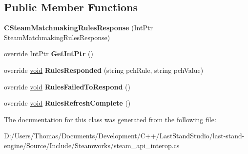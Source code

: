 \subsection*{Public Member Functions}
\begin{DoxyCompactItemize}
\item 
\hypertarget{classValve_1_1Steamworks_1_1CSteamMatchmakingRulesResponse_ad5876b16e99e501e32f796babdb3693d}{}{\bfseries C\+Steam\+Matchmaking\+Rules\+Response} (Int\+Ptr Steam\+Matchmaking\+Rules\+Response)\label{classValve_1_1Steamworks_1_1CSteamMatchmakingRulesResponse_ad5876b16e99e501e32f796babdb3693d}

\item 
\hypertarget{classValve_1_1Steamworks_1_1CSteamMatchmakingRulesResponse_a84d95ba9cbd3a9f2ecad35c6f7577706}{}override Int\+Ptr {\bfseries Get\+Int\+Ptr} ()\label{classValve_1_1Steamworks_1_1CSteamMatchmakingRulesResponse_a84d95ba9cbd3a9f2ecad35c6f7577706}

\item 
\hypertarget{classValve_1_1Steamworks_1_1CSteamMatchmakingRulesResponse_a806baba8409d76e4c45d60acf83f9e78}{}override \hyperlink{SDL__audio_8h_a52835ae37c4bb905b903cbaf5d04b05f}{void} {\bfseries Rules\+Responded} (string pch\+Rule, string pch\+Value)\label{classValve_1_1Steamworks_1_1CSteamMatchmakingRulesResponse_a806baba8409d76e4c45d60acf83f9e78}

\item 
\hypertarget{classValve_1_1Steamworks_1_1CSteamMatchmakingRulesResponse_a0e0e4599c2a1769b048b6ee9a3ee9182}{}override \hyperlink{SDL__audio_8h_a52835ae37c4bb905b903cbaf5d04b05f}{void} {\bfseries Rules\+Failed\+To\+Respond} ()\label{classValve_1_1Steamworks_1_1CSteamMatchmakingRulesResponse_a0e0e4599c2a1769b048b6ee9a3ee9182}

\item 
\hypertarget{classValve_1_1Steamworks_1_1CSteamMatchmakingRulesResponse_a20e89c4b25490658b7925b20dad8fb4c}{}override \hyperlink{SDL__audio_8h_a52835ae37c4bb905b903cbaf5d04b05f}{void} {\bfseries Rules\+Refresh\+Complete} ()\label{classValve_1_1Steamworks_1_1CSteamMatchmakingRulesResponse_a20e89c4b25490658b7925b20dad8fb4c}

\end{DoxyCompactItemize}


The documentation for this class was generated from the following file\+:\begin{DoxyCompactItemize}
\item 
D\+:/\+Users/\+Thomas/\+Documents/\+Development/\+C++/\+Last\+Stand\+Studio/last-\/stand-\/engine/\+Source/\+Include/\+Steamworks/steam\+\_\+api\+\_\+interop.\+cs\end{DoxyCompactItemize}
